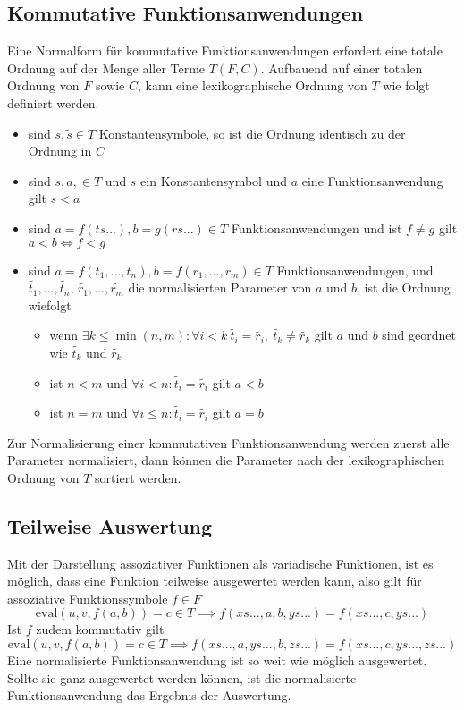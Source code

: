 \documentclass{article}
\begin{document}
\subsection{Kommutative Funktionsanwendungen}
Eine Normalform für kommutative Funktionsanwendungen erfordert eine totale Ordnung auf der Menge aller Terme $T(F, C)$. Aufbauend auf einer totalen Ordnung von $F$ sowie $C$, kann eine lexikographische Ordnung von $T$ wie folgt definiert werden. 
\begin{itemize}
	\item{sind $s, \tilde{s} \in T$ Konstantensymbole, so ist die Ordnung identisch zu der Ordnung in $C$}
	\item{sind $s, a, \in T$ und $s$ ein Konstantensymbol und $a$ eine Funktionsanwendung gilt $s < a$ }
	\item{sind $a = f(ts...), b = g(rs...) \in T$ Funktionsanwendungen und ist $f \neq g$ gilt $a < b \iff f < g $}
	\item{sind $a = f(t_1, \dots, t_n), b = f(r_1, \dots, r_m) \in T$ Funktionsanwendungen, und $\tilde{t_1}, \dots, \tilde{t_n}$, $\tilde{r_1}, \dots, \tilde{r_m}$ die normalisierten Parameter von $a$ und $b$, ist die Ordnung wiefolgt}
	\begin{itemize}
		\item{wenn $\exists k \leq \min{(n, m)} \colon \forall i < k ~ \tilde{t_i} = \tilde{r_i} ,~ \tilde{t_k} \neq \tilde{r_k} $ gilt $a$ und $b$ sind geordnet wie $\tilde{t_k}$ und $\tilde{r_k}$}
		\item{ist $n < m$ und $\forall i < n\colon \tilde{t_i} = \tilde{r_i}$ gilt $a < b$}
		\item{ist $n = m$ und $\forall i \leq n\colon \tilde{t_i} = \tilde{r_i}$ gilt $a = b$}
	\end{itemize}
\end{itemize}
Zur Normalisierung einer kommutativen Funktionsanwendung werden zuerst alle Parameter normalisiert, dann können die Parameter nach der lexikographischen Ordnung von $T$ sortiert werden.

\subsection{Teilweise Auswertung}
Mit der Darstellung assoziativer Funktionen als variadische Funktionen, ist es möglich, dass eine Funktion teilweise ausgewertet werden kann, also gilt für assoziative Funktionssymbole $f \in F$
$$\mathrm{eval}(u, v, f(a, b)) = c \in T \implies f(xs..., a, b, ys...) = f(xs..., c, ys...)$$
Ist $f$ zudem kommutativ gilt 
$$\mathrm{eval}(u, v, f(a, b)) = c \in T \implies f(xs..., a, ys..., b, zs...) = f(xs..., c, ys..., zs...)$$
Eine normalisierte Funktionsanwendung ist so weit wie möglich ausgewertet. Sollte sie ganz ausgewertet werden können, ist die normalisierte Funktionsanwendung das Ergebnis der Auswertung.
\end{document}
